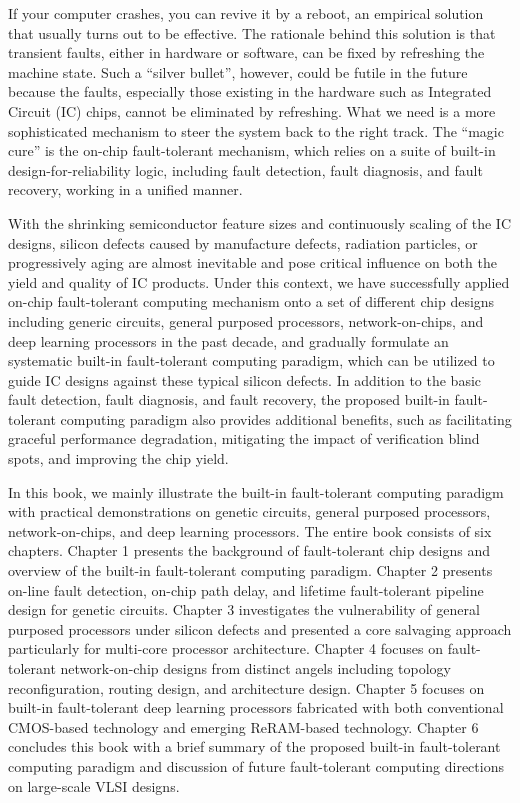 %
%

\preface
If your computer crashes, you can revive it by a reboot, an empirical solution that usually turns out to be effective. The rationale behind this solution is that transient faults, either in hardware or software, can be fixed by refreshing the machine state. Such a “silver bullet”, however, could be futile in the future because the faults, especially those existing in the hardware such as Integrated Circuit (IC) chips, cannot be eliminated by refreshing. What we need is a more sophisticated mechanism to steer the system back to the right track. The “magic cure” is the on-chip fault-tolerant mechanism, which relies on a suite of built-in design-for-reliability logic, including fault detection, fault diagnosis, and fault recovery, working in a unified manner. 

With the shrinking semiconductor feature sizes and continuously scaling of the IC designs, silicon defects caused by manufacture defects, radiation particles, or progressively aging are almost inevitable and pose critical influence on both the yield and quality of IC products. Under this context, we have successfully applied on-chip fault-tolerant computing mechanism onto a set of different chip designs including generic circuits, general purposed processors, network-on-chips, and deep learning processors in the past decade, and gradually formulate an systematic built-in fault-tolerant computing paradigm, which can be utilized to guide IC designs against these typical silicon defects. In addition to the basic fault detection, fault diagnosis, and fault recovery, the proposed built-in fault-tolerant computing paradigm also provides additional benefits, such as facilitating graceful performance degradation, mitigating the impact of verification blind spots, and improving the chip yield.

In this book, we mainly illustrate the built-in fault-tolerant computing paradigm with practical demonstrations on genetic circuits, general purposed processors, network-on-chips, and deep learning processors. The entire book consists of six chapters. Chapter 1 presents the background of fault-tolerant chip designs and overview of the built-in fault-tolerant computing paradigm. Chapter 2 presents on-line fault detection, on-chip path delay, and lifetime fault-tolerant pipeline design for genetic circuits. Chapter 3 investigates the vulnerability of general purposed processors under silicon defects and presented a core salvaging approach particularly for multi-core processor architecture. Chapter 4 focuses on fault-tolerant network-on-chip designs from distinct angels including topology reconfiguration, routing design, and architecture design. Chapter 5 focuses on built-in fault-tolerant deep learning processors fabricated with both conventional CMOS-based technology and emerging ReRAM-based technology. Chapter 6 concludes this book with a brief summary of the proposed built-in fault-tolerant computing paradigm and discussion of future fault-tolerant computing directions on large-scale VLSI designs.

